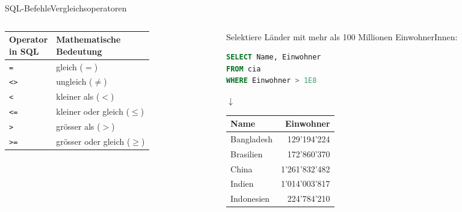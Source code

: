 \begin{frame}[fragile]{SQL-Befehle}{Vergleichsoperatoren}
  \begin{columns}[c]
    \centering
    \begin{column}{.35\textwidth}
      \begin{table}[H]
        \centering
        \tiny
        \begin{tabular}{l|l}
          \makecell{\textbf{Operator}                \\\textbf{in SQL}} & \makecell{\textbf{Mathematische}\\\textbf{Bedeutung}} \\\midrule
          \texttt{=}  & gleich ($=$)                 \\
          \texttt{<>} & ungleich ($\neq$)            \\
          \texttt{<}  & kleiner als ($<$)            \\
          \texttt{<=} & kleiner oder gleich ($\leq$) \\
          \texttt{>}  & grösser als ($>$)            \\
          \texttt{>=} & grösser oder gleich ($\geq$)
        \end{tabular}
      \end{table}
    \end{column}
    \begin{column}{.6\textwidth}
      \scriptsize
      Selektiere Länder mit mehr als 100 Millionen EinwohnerInnen:
      \begin{lstlisting}[language=SQL, basicstyle=\ttfamily\scriptsize]
SELECT Name, Einwohner
FROM cia
WHERE Einwohner > 1E8
\end{lstlisting}
      \centering$\downarrow$
      \begin{table}
        \centering\tiny
        \begin{tabular}{lr}
          \toprule
          \textbf{Name}                  & \textbf{Einwohner} \\
          \midrule
          Bangladesh                     & 129'194'224        \\
          Brasilien                      & 172'860'370        \\
          China                          & 1'261'832'482      \\
          Indien                         & 1'014'003'817      \\
          Indonesien                     & 224'784'210        \\

\end{tabular}
\end{table}
\end{column}
\end{columns}
\end{frame}
